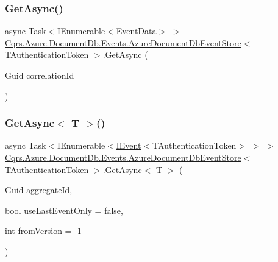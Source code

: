 \subsubsection{\texorpdfstring{Get\+Async()}{GetAsync()}\hspace{0.1cm}{\footnotesize\ttfamily [2/2]}}
{\footnotesize\ttfamily async Task$<$I\+Enumerable$<$\hyperlink{classCqrs_1_1Events_1_1EventData}{Event\+Data}$>$ $>$ \hyperlink{classCqrs_1_1Azure_1_1DocumentDb_1_1Events_1_1AzureDocumentDbEventStore}{Cqrs.\+Azure.\+Document\+Db.\+Events.\+Azure\+Document\+Db\+Event\+Store}$<$ T\+Authentication\+Token $>$.Get\+Async (\begin{DoxyParamCaption}\item[{Guid}]{correlation\+Id }\end{DoxyParamCaption})\hspace{0.3cm}{\ttfamily [protected]}}

\mbox{\label{classCqrs_1_1Azure_1_1DocumentDb_1_1Events_1_1AzureDocumentDbEventStore_a2845015d6fda0d9e79b77b82d9452a4d}} 
\subsubsection{\texorpdfstring{Get\+Async$<$ T $>$()}{GetAsync< T >()}}
{\footnotesize\ttfamily async Task$<$I\+Enumerable$<$\hyperlink{interfaceCqrs_1_1Events_1_1IEvent}{I\+Event}$<$T\+Authentication\+Token$>$ $>$ $>$ \hyperlink{classCqrs_1_1Azure_1_1DocumentDb_1_1Events_1_1AzureDocumentDbEventStore}{Cqrs.\+Azure.\+Document\+Db.\+Events.\+Azure\+Document\+Db\+Event\+Store}$<$ T\+Authentication\+Token $>$.\hyperlink{classCqrs_1_1Azure_1_1DocumentDb_1_1Events_1_1AzureDocumentDbEventStore_a8b481bf0b0f6b50184441965630f5443}{Get\+Async}$<$ T $>$ (\begin{DoxyParamCaption}\item[{Guid}]{aggregate\+Id,  }\item[{bool}]{use\+Last\+Event\+Only = {\ttfamily false},  }\item[{int}]{from\+Version = {\ttfamily -\/1} }\end{DoxyParamCaption})\hspace{0.3cm}{\ttfamily [protected]}}


